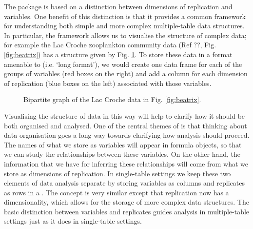 \documentclass[a4paper]{report}
\numberwithin{exercise}{section}
\begin{document}
\begin{article}
The  package is based on a distinction between dimensions of replication and variables.  One benefit of this distinction is that it provides a common framework for understanding both simple and more complex multiple-table data structures.  In particular, the framework allows us to visualise the structure of complex data; for example the Lac Croche zooplankton community data (Ref ??, Fig. \ref{fig:beatrix}) has a structure given by Fig. \ref{fig:bipartitebeatrix}.  To store these data in a format amenable to  (i.e. `long format'), we would create one data frame for each of the groups of variables (red boxes on the right) and add a column for each dimension of replication (blue boxes on the left) associated with those variables.

\begin{figure}
\vspace{0.1cm}
\caption{Bipartite graph of the Lac Croche data in Fig. \ref{fig:beatrix}.} 
\label{fig:bipartitebeatrix}
\end{figure}

Visualising the structure of data in this way will help to clarify how it should be both organised and analysed.  One of the central themes of  is that thinking about data organisation goes a long way towards clarifying how analysis should proceed.  The names of what we store as variables will appear in formula objects, so that we can study the relationships between these variables.  On the other hand, the information that we have for inferring these relationships will come from what we store as dimensions of replication.  In single-table settings we keep these two elements of data analysis separate by storing variables as columns and replicates as rows in a .  The  concept is very similar except that replication now has a dimensionality, which allows for the storage of more complex data structures.  The basic distinction between variables and replicates guides analysis in multiple-table settings just as it does in single-table settings.


\end{article}
\end{document}

